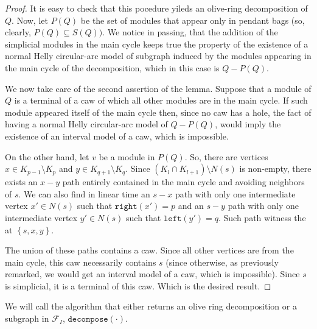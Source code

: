 \documentclass{article}
\theoremstyle{definition}
\begin{document}
\begin{proof}
        It is easy to check that this
        pocedure yileds an olive-ring
        decomposition of $Q$. 
        Now, let $P\left(Q\right)$ 
        be the set of modules that
        appear only in pendant bags
        (so, clearly, $P\left(Q\right) \subseteq S\left(Q\right))$.
        We notice
        in passing, that the addition of
        the simplicial modules in the main
        cycle keeps true the property
        of the existence of a normal
        Helly circular-arc model
        of subgraph induced
        by the modules appearing 
        in the main cycle 
        of the decomposition,
        which in this case
        is $Q - P\left(Q\right)$.
        
        We now take care of the 
        second assertion of the lemma.
        Suppose that a module of $Q$
        is a terminal of a caw of which
        all other modules are in the
        main cycle. If such module
        appeared itself of the main
        cycle then, since no
        caw has a hole, 
        the fact of having a normal Helly
        circular-arc model of $Q - P\left(Q\right)$,
        would imply the existence of 
        an interval model of a caw, which
        is impossible. 

        On the other hand, let 
        $v$ be a module in $P\left(Q\right)$.
        So, there are vertices $x \in K_{p-1} \setminus K_{p}$ 
        and $y \in K_{q+1} \setminus K_{q}$.
        Since $\left(K_{l} \cap K_{l+1}\right) \setminus N\left(s\right)$
        is non-empty, there exists an
        $x-y$ path entirely contained
        in the main cycle and avoiding
        neighbors of $s$. We can also
        find in linear time
        an $s-x$ path with only one intermediate
        vertex $x' \in N\left(s\right)$
        such that $\texttt{right}\left(x'\right)=p$
        and an $s-y$ path with only one intermediate
        vertex $y' \in N\left(s\right)$ 
        such that $\texttt{left}\left(y'\right)=q$.
        Such path witness the at $\left\{s, x, y\right\}$.

        The union of these paths contains a caw.
        Since all other vertices are from the main 
        cycle, this caw necessarily contains $s$ 
        (since otherwise, as previously remarked,
        we would get an interval model of a caw,
        which is impossible).
        Since $s$ is simplicial, 
        it is a terminal of this caw.
        Which is the desired result.
    \end{proof}
    
    We will call the algorithm
    that either returns an olive ring
    decomposition or a subgraph in $\mathcal{F}_{I}$,
    $\texttt{decompose}\left(\cdot\right)$.
    
\end{document}
